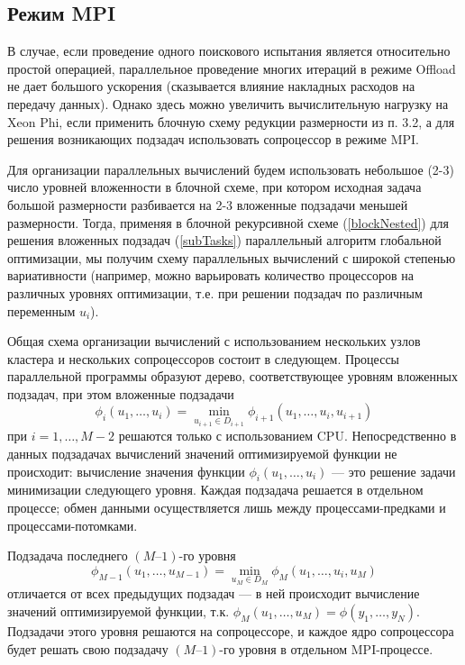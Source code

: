 \subsection{Режим MPI}
В случае, если проведение одного поискового испытания является относительно простой операцией, параллельное проведение многих итераций в режиме Offload не дает большого ускорения (сказывается влияние накладных расходов на передачу данных). Однако здесь можно увеличить вычислительную нагрузку на Xeon Phi, если применить блочную схему редукции размерности из п. 3.2, а для решения возникающих подзадач использовать сопроцессор в режиме MPI.
\par
Для организации параллельных вычислений будем использовать небольшое (2-3) число уровней вложенности в блочной схеме, при котором исходная задача большой размерности разбивается на 2-3 вложенные подзадачи меньшей размерности. Тогда, применяя в блочной рекурсивной схеме (\ref{blockNested}) для решения вложенных подзадач (\ref{subTasks}) параллельный алгоритм глобальной оптимизации, мы получим схему параллельных вычислений с широкой степенью вариативности (например, можно варьировать количество процессоров на различных уровнях оптимизации, т.е. при решении подзадач по различным переменным \(u_i\)).
\par
Общая схема организации вычислений с использованием нескольких узлов кластера и нескольких сопроцессоров состоит в следующем. Процессы параллельной программы образуют дерево, соответствующее уровням вложенных подзадач, при этом вложенные подзадачи
\begin{displaymath}
\phi_i(u_1,\dots,u_i)=\min_{u_{i+1}\in D_{i+1}}\phi_{i+1}(u_1,\dots,u_i,u_{i+1})
\end{displaymath}
при \(i=1,\dots,M-2\) решаются только с использованием CPU. Непосредственно в данных подзадачах вычислений значений оптимизируемой функции не происходит: вычисление значения функции \(\phi_i(u_1,\dots,u_i)\) --- это решение задачи минимизации следующего уровня. Каждая подзадача решается в отдельном процессе; обмен данными осуществляется лишь между процессами-предками и процессами-потомками.
\par
Подзадача последнего \((M–1)\)-го уровня 
\begin{displaymath}
\phi_{M-1}(u_1,\dots,u_{M-1})=\min_{u_{M}\in D_{M}}\phi_{M}(u_1,\dots,u_i,u_{M})
\end{displaymath} 
отличается от всех предыдущих подзадач --- в ней происходит вычисление значений оптимизируемой функции, т.к. \(\phi_M(u_1,\dots,u_M)=\phi(y_1,\dots,y_N)\). Подзадачи этого уровня решаются на сопроцессоре, и каждое ядро сопроцессора будет решать свою подзадачу \((M–1)\)-го уровня в отдельном MPI-процессе.
